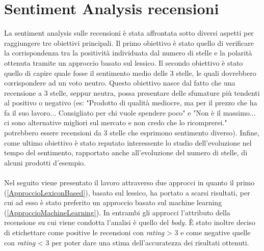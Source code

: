 \section{Sentiment Analysis recensioni}\label{SentimentAnalysis}
La sentiment analysis sulle recensioni è stata affrontata sotto diversi aspetti per raggiungere tre obiettivi principali. Il primo obiettivo è stato quello di verificare la corrispondenza tra la positività individuata dal numero di stelle e la polarità ottenuta tramite un approccio basato sul lessico. Il secondo obiettivo è stato quello di capire quale fosse il sentimento medio delle 3 stelle, le quali dovrebbero corrispondere ad un voto neutro. Questo obiettivo nasce dal fatto che una recensione a 3 stelle, seppur neutra, possa presentare delle sfumature più tendenti al positivo o negativo (es: "Prodotto di qualità mediocre, ma per il prezzo che ha fa il suo lavoro... Consigliato per chi vuole spendere poco" e "Non è il massimo... ci sono alternative migliori sul mercato e non credo che lo ricomprerei." potrebbero essere recensioni da 3 stelle che esprimono sentimento diverso). Infine, come ultimo obiettivo è stato reputato interessente lo studio dell'evoluzione nel tempo del sentimento, rapportato anche all'evoluzione del numero di stelle, di alcuni prodotti d'esempio. 
\\\\
Nel seguito viene presentato il lavoro attraverso due approcci in quanto il primo (\ref{ApproccioLexiconBased}), basato sul lessico, ha portato a scarsi risultati, per cui ad esso è stato preferito un approccio basato sul machine learning (\ref{ApproccioMachineLearning}).
In entrambi gli approcci l'attributo della recensione su cui viene condotta l'analisi è quello del \textit{body}. È stato inoltre deciso di etichettare come positive le recensioni con \textit{rating} > 3 e come negative quelle con \textit{rating} < 3 per poter dare una stima dell'accuratezza dei risultati ottenuti.


